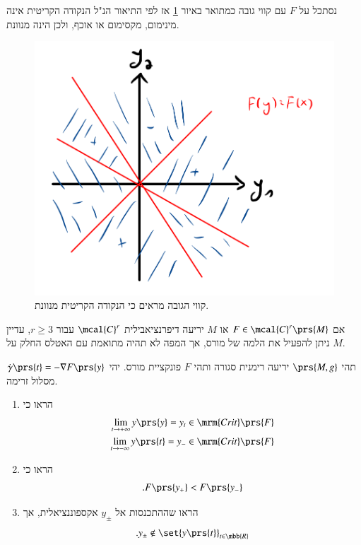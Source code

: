 \documentclass[a4paper,10pt,twoside,openany]{book}
\begin{document}
\begin{example}
נסתכל על
$F$
עם קווי גובה כמתואר באיור
\ref{2.3}
אז לפי התיאור הנ"ל הנקודה הקריטית אינה מינימום, מקסימום או אוכף, ולכן הינה מנוונת.

\begin{figure}
\centering
\includegraphics[scale=0.5]{sources/2.3}
\caption{קווי הגובה מראים כי הנקודה הקריטית מנוונת.}
\label{2.3}
\end{figure}
\end{example}

\begin{remark}
אם
$F \in \mcal{C}^r\prs{M}$
או
$M$
יריעה דיפרנציאבילית
$\mcal{C}^r$
עבור
$r \geq 3$,
עדיין ניתן להפעיל את הלמה של מורס, אך המפה לא תהיה מתואמת עם האטלס החלק על
$M$.
\end{remark}

\begin{exercise}
תהי
$\prs{M,g}$
יריעה רימנית סגורה ותהי
$F$
פונקציית מורס.
יהי
$\dot{\gamma}\prs{t} = - \nabla F\prs{y}$
מסלול זרימה.

\begin{enumerate}
\item
הראו כי
\begin{align*}
\lim_{t \to +\infty} y\prs{y} = y_t \in \mrm{Crit}\prs{F} \\
\lim_{t \to -\infty} y\prs{t} = y_- \in \mrm{Crit}\prs{F}
\end{align*}
\item
הראו כי
\[\text{.} F\prs{y_+} < F\prs{y_-}\]
\item הראו שההתכנסות אל
$y_\pm$
אקספוננציאלית, אך
\[\text{.} y_\pm \notin \set{y\prs{t}}_{t \in \mbb{R}}\]
\end{enumerate}
\end{exercise}
\end{document}
